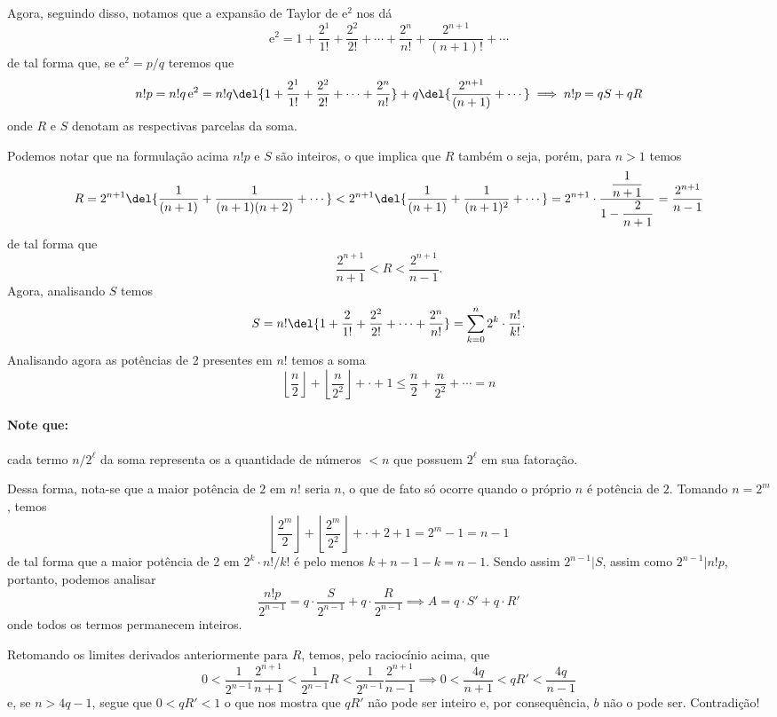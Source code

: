 \documentclass{IMTexam}
\begin{document}
\begin{questions}
\begin{solution}
            Agora, seguindo disso, notamos que a expansão de Taylor de $\mathrm{e}^2$ nos dá
            \[ \mathrm{e}^2 =1+\dfrac{2^1}{1!}+\dfrac{2^2}{2!}+\cdots+\dfrac{2^n}{n!}+\dfrac{2^{n+1}}{(n+1)!}+\cdots \]
            de tal forma que, se $\mathrm{e}^2=p/q$ teremos que
            \[ n!p=n!q\,\mathrm{e}^2=n!q\del{1+\dfrac{2^1}{1!}+\dfrac{2^2}{2!}+\cdots+\dfrac{2^n}{n!}}+q\del{\dfrac{2^{n+1}}{(n+1)}+\cdots}\implies n!p=qS+qR \]
            onde $R$ e $S$ denotam as respectivas parcelas da soma.

            Podemos notar que na formulação acima $n!p$ e $S$ são inteiros, o que implica que $R$ também o seja, porém, para $n>1$ temos
            \[ R=2^{n+1}\del{\dfrac{1}{(n+1)}+\dfrac{1}{(n+1)(n+2)}+\cdots}<2^{n+1}\del{\dfrac{1}{(n+1)}+\dfrac{1}{(n+1)^2}+\cdots}=2^{n+1}\cdot\dfrac{\dfrac{1}{n+1}}{1-\dfrac{2}{n+1}}=\dfrac{2^{n+1}}{n-1} \]
            de tal forma que
            \[ \dfrac{2^{n+1}}{n+1}<R<\dfrac{2^{n+1}}{n-1}. \]
            Agora, analisando $S$ temos
            \[ S=n!\del{1+\dfrac{2}{1!}+\dfrac{2^2}{2!}+\cdots+\dfrac{2^n}{n!}}=\sum_{k=0}^n2^k\cdot\dfrac{n!}{k!}. \]
            Analisando agora as potências de 2 presentes em $n!$ temos a soma
            \[ \left\lfloor\dfrac{n}{2}\right\rfloor+\left\lfloor\dfrac{n}{2^2}\right\rfloor+\cdot +1\leqslant \dfrac{n}{2}+\dfrac{n}{2^2}+\cdots=n \]
            \paragraph{Note que:} cada termo $n/2^\ell$ da soma representa os a quantidade de números $<n$ que possuem $2^\ell$ em sua fatoração.

            Dessa forma, nota-se que a maior potência de $2$ em $n!$ seria $n$, o que de fato só ocorre quando o próprio $n$ é potência de $2$. Tomando $n=2^m$, temos
            \[ \left\lfloor\dfrac{2^m}{2}\right\rfloor+\left\lfloor\dfrac{2^m}{2^2}\right\rfloor+\cdot +2+1 = 2^m - 1 = n-1 \]
            de tal forma que a maior potência de 2 em $2^k\cdot n!/k!$ é pelo menos $k+n-1-k=n-1$. Sendo assim $2^{n-1}|S$, assim como $2^{n-1}|n!p$, portanto, podemos analisar
            \[ \dfrac{n!p}{2^{n-1}}=q\cdot\dfrac{S}{2^{n-1}}+q\cdot\dfrac{R}{2^{n-1}}\implies A=q\cdot S'+q\cdot R' \]
            onde todos os termos permanecem inteiros.

            Retomando os limites derivados anteriormente para $R$, temos, pelo raciocínio acima, que
            \[ 0<\dfrac{1}{2^{n-1}}\dfrac{2^{n+1}}{n+1}<\dfrac{1}{2^{n-1}}R<\dfrac{1}{2^{n-1}}\dfrac{2^{n+1}}{n-1}\implies 0<\dfrac{4q}{n+1}<qR'<\dfrac{4q}{n-1} \]
            e, se $n>4q-1$, segue que $0<qR'<1$ o que nos mostra que $qR'$ não pode ser inteiro e, por consequência, $b$ não o pode ser. Contradição!


\end{solution}
\end{questions}
\end{document}
